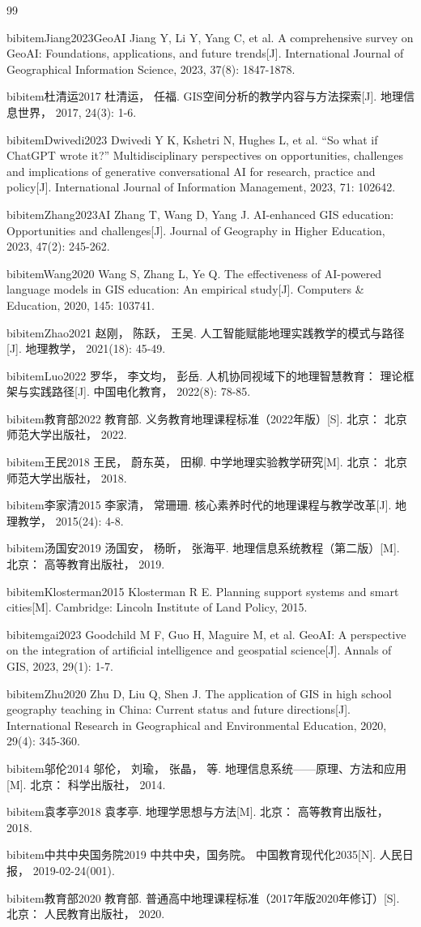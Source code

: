 \begin{thebibliography}{99}
\small

bibitem{Jiang2023GeoAI}
Jiang Y, Li Y, Yang C, et al. A comprehensive survey on GeoAI: Foundations, applications, and future trends[J]. International Journal of Geographical Information Science, 2023, 37(8): 1847-1878.

bibitem{杜清运2017}
杜清运， 任福. GIS空间分析的教学内容与方法探索[J]. 地理信息世界， 2017, 24(3): 1-6.

bibitem{Dwivedi2023}
Dwivedi Y K, Kshetri N, Hughes L, et al. ``So what if ChatGPT wrote it?'' Multidisciplinary perspectives on opportunities, challenges and implications of generative conversational AI for research, practice and policy[J]. International Journal of Information Management, 2023, 71: 102642.

bibitem{Zhang2023AI}
Zhang T, Wang D, Yang J. AI-enhanced GIS education: Opportunities and challenges[J]. Journal of Geography in Higher Education, 2023, 47(2): 245-262.

bibitem{Wang2020}
Wang S, Zhang L, Ye Q. The effectiveness of AI-powered language models in GIS education: An empirical study[J]. Computers \& Education, 2020, 145: 103741.

bibitem{Zhao2021}
赵刚， 陈跃， 王吴. 人工智能赋能地理实践教学的模式与路径[J]. 地理教学， 2021(18): 45-49.

bibitem{Luo2022}
罗华， 李文均， 彭岳. 人机协同视域下的地理智慧教育： 理论框架与实践路径[J]. 中国电化教育， 2022(8): 78-85.

bibitem{教育部2022}
教育部. 义务教育地理课程标准（2022年版）[S]. 北京： 北京师范大学出版社， 2022.

bibitem{王民2018}
王民， 蔚东英， 田柳. 中学地理实验教学研究[M]. 北京： 北京师范大学出版社， 2018.

bibitem{李家清2015}
李家清， 常珊珊. 核心素养时代的地理课程与教学改革[J]. 地理教学， 2015(24): 4-8.

bibitem{汤国安2019}
汤国安， 杨昕， 张海平. 地理信息系统教程（第二版）[M]. 北京： 高等教育出版社， 2019.

bibitem{Klosterman2015}
Klosterman R E. Planning support systems and smart cities[M]. Cambridge: Lincoln Institute of Land Policy, 2015.

bibitem{gai2023}
Goodchild M F, Guo H, Maguire M, et al. GeoAI: A perspective on the integration of artificial intelligence and geospatial science[J]. Annals of GIS, 2023, 29(1): 1-7.

bibitem{Zhu2020}
Zhu D, Liu Q, Shen J. The application of GIS in high school geography teaching in China: Current status and future directions[J]. International Research in Geographical and Environmental Education, 2020, 29(4): 345-360.

bibitem{邬伦2014}
邬伦， 刘瑜， 张晶， 等. 地理信息系统——原理、方法和应用[M]. 北京： 科学出版社， 2014.

bibitem{袁孝亭2018}
袁孝亭. 地理学思想与方法[M]. 北京： 高等教育出版社， 2018.

bibitem{中共中央国务院2019}
中共中央，国务院。 中国教育现代化2035[N]. 人民日报， 2019-02-24(001).

bibitem{教育部2020}
教育部. 普通高中地理课程标准（2017年版2020年修订）[S]. 北京： 人民教育出版社， 2020.

\end{thebibliography}